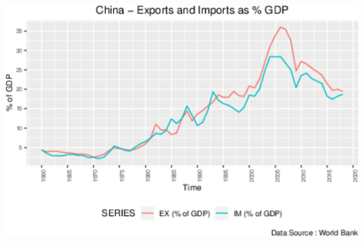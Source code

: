 \documentclass[11pt,preprint, authoryear]{elsarticle}
\let\origfigure\figure
\let\endorigfigure\endfigure
\renewenvironment{figure}[1][2] {
    \expandafter\origfigure\expandafter[H]
} {
    \endorigfigure
}
\numberwithin{equation}{section}
\numberwithin{figure}{section}
\numberwithin{table}{section}
\begin{document}
\begin{figure}[H]

{\centering \includegraphics{tradedynamics1_files/figure-latex/Graph7-1} 

}

\caption{China Export and Import Growth \label{Graph7}}\label{fig:Graph7}
\end{figure}
\end{document}
